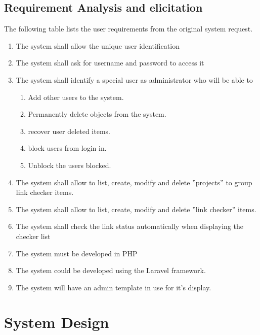 \subsection{Requirement Analysis and elicitation}
The following table lists the user requirements from the original system request.
\begin{enumerate}
	\item The system shall allow the unique user identification
	\item The system shall ask for username and password to access it
	\item The system shall identify a special user as administrator who will be able to
	\begin{enumerate}
		\item Add other users to the system.
		\item Permanently delete objects from the system.
		\item recover user deleted items.
		\item block users from login in.
		\item Unblock the users blocked.
	\end{enumerate}
	\item The system shall allow to list, create, modify and delete ''projects'' to group link checker items.
	\item The system shall allow to list, create, modify and delete ''link checker'' items.
	\item The system shall check the link status automatically when displaying the checker list
	\item The system must be developed in PHP
	\item The system could be developed using the Laravel framework.
	\item The system will have an admin template in use for it's display.
\end{enumerate}

\section{System Design}

